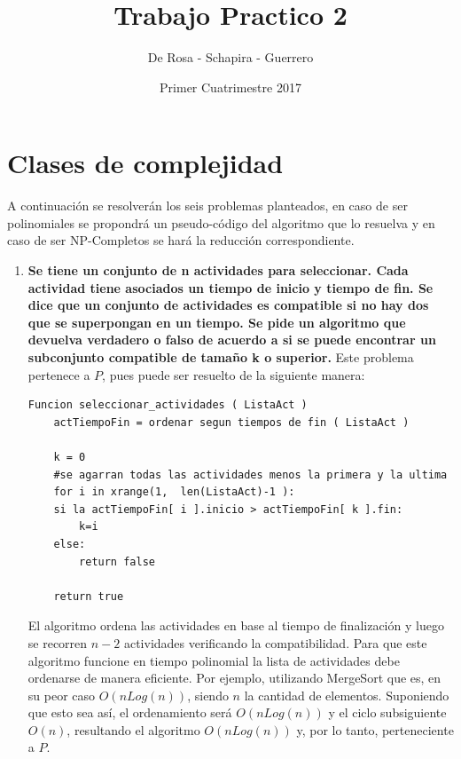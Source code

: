 \documentclass{article}
\title{Trabajo Practico 2}
\author{De Rosa - Schapira - Guerrero}
\date{Primer Cuatrimestre 2017}
\newcommand\tab[1][0.5cm]{\hspace*{#1}}
\begin{document}
    \maketitle
    \newpage
    \tableofcontents
    \newpage

    \section{Clases de complejidad}
    \tab A continuación se resolverán los seis problemas planteados, en caso de ser polinomiales se propondrá un
    pseudo-código del algoritmo que lo resuelva y en caso de ser NP-Completos se hará la reducción correspondiente.
    \begin{enumerate}
        \item \textbf{Se tiene un conjunto de n actividades para seleccionar. Cada actividad tiene asociados un tiempo de
            inicio y tiempo de fin. Se dice que un conjunto de actividades es compatible si no hay dos que se
            superpongan en un tiempo. Se pide un algoritmo que devuelva verdadero o falso de acuerdo a si se
            puede encontrar un subconjunto compatible de tamaño k o superior.} %
            \tab Este problema pertenece a $P$, pues puede ser resuelto de la siguiente manera: %
            \begin{lstlisting}
Funcion seleccionar_actividades ( ListaAct )
    actTiempoFin = ordenar segun tiempos de fin ( ListaAct )

    k = 0
    #se agarran todas las actividades menos la primera y la ultima
    for i in xrange(1,  len(ListaAct)-1 ):
    si la actTiempoFin[ i ].inicio > actTiempoFin[ k ].fin:
        k=i
    else:
        return false

    return true
            \end{lstlisting}

            \tab El algoritmo ordena las actividades en base al tiempo de finalización y luego se recorren $n-2$
            actividades verificando la compatibilidad.
            \tab Para que este algoritmo funcione en tiempo polinomial la lista de actividades debe ordenarse
            de manera eficiente. Por ejemplo, utilizando MergeSort que es, en su peor caso $O(n Log(n))$, siendo
            $n$ la cantidad de elementos.
            \tab Suponiendo que esto sea así, el ordenamiento será $O(n Log(n))$ y el ciclo subsiguiente $O(n)$,
            resultando el algoritmo $O(n Log(n))$ y, por lo tanto, perteneciente a $P$.


\end{enumerate}
\end{document}
